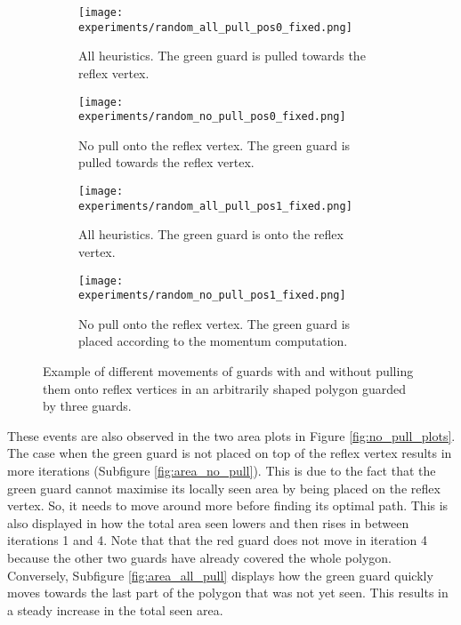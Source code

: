 \begin{figure}[h!]
    \centering
    \begin{subfigure}{0.45\textwidth}
        \texttt{[image: experiments/random\_all\_pull\_pos0\_fixed.png]}
        \caption{All heuristics. The green guard is pulled towards the reflex vertex.}
        \label{fig:all_pull_pos0}
    \end{subfigure}
    \hfill
    \begin{subfigure}{0.45\textwidth}
        \texttt{[image: experiments/random\_no\_pull\_pos0\_fixed.png]}
        \caption{No pull onto the reflex vertex. The green guard is pulled towards the reflex vertex.}
        \label{fig:no_pull_pos0}
    \end{subfigure}
    \begin{subfigure}{0.45\textwidth}
        \texttt{[image: experiments/random\_all\_pull\_pos1\_fixed.png]}
        \caption{All heuristics. The green guard is onto the reflex vertex.}
        \label{fig:all_pull_pos1}
    \end{subfigure}
    \hfill
    \begin{subfigure}{0.45\textwidth}
        \texttt{[image: experiments/random\_no\_pull\_pos1\_fixed.png]}
        \caption{No pull onto the reflex vertex. The green guard is placed according to the momentum computation.}
        \label{fig:no_pull_pos1}
    \end{subfigure}
    \caption{Example of different movements of guards with and without pulling them onto reflex vertices in an arbitrarily shaped polygon guarded by three guards.}
    \label{fig:no_pull_eg}
\end{figure}

These events are also observed in the two area plots in Figure \ref{fig:no_pull_plots}. The case when the green guard is not placed on top of the reflex vertex results in more iterations (Subfigure \ref{fig:area_no_pull}). This is due to the fact that the green guard cannot maximise its locally seen area by being placed on the reflex vertex. So, it needs to move around more before finding its optimal path. This is also displayed in how the total area seen lowers and then rises in between iterations 1 and 4. Note that that the red guard does not move in iteration 4 because the other two guards have already covered the whole polygon. Conversely, Subfigure \ref{fig:area_all_pull} displays how the green guard quickly moves towards the last part of the polygon that was not yet seen. This results in a steady increase in the total seen area.

